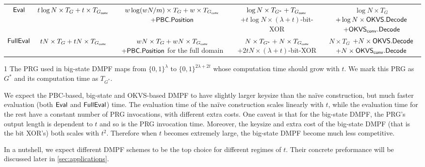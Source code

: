 \begin{table*}
\begin{threeparttable}
\begin{tabular}{ccccc}
        \cline{1-5}

	${\sf Eval}$ & $t\log N\times T_G+t\times T_{G_{\sf conv}}$ &\makecell{$w\log(wN/m)\times T_G + w\times T_{G_{\sf conv}}$\\$+{\sf PBC}.{\sf Position}$} & \makecell{$\log N\times T_{G^*} + T_{G_{\sf conv}}$\\$+t\log N \times (\lambda+t)$-bit-XOR}&\makecell{$\log N\times T_G$ \\$+\log N\times{\sf OKVS}.{\sf Decode}$\\ $+\OKVS_{\sf conv}.\Decode$} \\

        \cline{1-5}

	${\sf FullEval}$ & $tN\times T_G+tN\times T_{G_{\sf conv}}$ &\makecell{$wN\times T_G+ wN\times T_{G_{\sf conv}}$\\$+{\sf PBC}.{\sf Position}$ for the full domain} & \makecell{$N\times T_{G^*} + N\times T_{G_{\sf conv}}$\\$+2tN\times (\lambda+t)$-bit-XOR }& \makecell{$N\times T_G$ \\ $+N\times{\sf OKVS}.{\sf Decode}$\\$+N\times {\sf OKVS}_{\sf conv}.{\sf Decode}$} \\
        \bottomrule
			\end{tabular}	
      \begin{tablenotes}
        \item [1] The PRG used in big-state DMPF maps from $\{0,1\}^\lambda$ to $\{0,1\}^{2\lambda+2t}$ whose computation time should grow with $t$. We mark this PRG as $G^*$ and its computation time as $T_{G^*}$. 
        \end{tablenotes}
    \end{threeparttable}
	\end{table*}
We expect the PBC-based, big-state and OKVS-based DMPF to have slightly larger keysize than the na\"ive construction, but much faster evaluation (both ${\sf Eval}$ and ${\sf FullEval}$) time. The evaluation time of the na\"ive construction scales linearly with $t$, while the evaluation time for the rest have a constant number of PRG invocations, with different extra costs. One caveat is that for the big-state DMPF, the PRG's output length is dependent to $t$ and so is the PRG invocation time. Moreover, the keysize and extra cost of the big-state DMPF (that is the bit XOR's) both scales with $t^2$. Therefore when $t$ becomes extremely large, the big-state DMPF become much less competitive. 

In a nutshell, we expect different DMPF schemes to be the top choice for  different regimes of $t$. Their concrete preformance will be discussed later in \cref{sec:applications}. 


